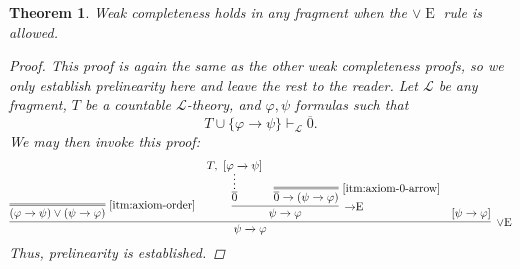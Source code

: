 \documentclass{amsart}
\newtheorem{theorem}{Theorem}[section]
\theoremstyle{definition}
\numberwithin{equation}{theorem}
\renewcommand{\phi}{\varphi}
\newcommand{\unvee}{{\vee}}
\newcommand{\proves}{\vdash}
\newcommand{\rat}[1]{{\overline{#1}}}
\newcommand{\narrow}[1]{\xrightarrow{#1}}
\renewcommand{\to}{\narrow{}}
\newcommand{\arr}{{\to}}
\newcommand{\elim}{\!\operatorname{E}}
\newcommand{\aref}[1]{\!\text{\ref{itm:axiom-#1}}}
\newcommand{\frag}{\mathcal{L}}
\begin{document}
\begin{theorem}\label{thm:infer-completeness}
  Weak completeness holds in any fragment when the $\unvee\elim$ rule is allowed.
  \begin{proof}
    This proof is again the same as the other weak completeness proofs, so we only establish prelinearity here and leave the rest to the reader.
    Let $\frag$ be any fragment, $T$ be a countable $\frag$-theory, and $\phi,\psi$ formulas such that
    \[
      T\cup\{\phi\to\psi\}\proves_\frag\rat 0.
    \]
    We may then invoke this proof:
    \[
      \infer[\unvee\elim]{\psi\to\phi}{
        \infer=[\aref{order}]{(\phi\to\psi)\vee(\psi\to\phi)}{} &
        \infer[\arr\elim]{\psi\to\phi}{
          \infer*{\rat 0}{T,\ [\phi\to\psi]} &
          \infer=[\aref{0-arrow}]{\rat 0\to(\psi\to\phi)}{}
        } &
        [\psi\to\phi]
      }
    \]
    Thus, prelinearity is established.
  \end{proof}
\end{theorem}
\end{document}
